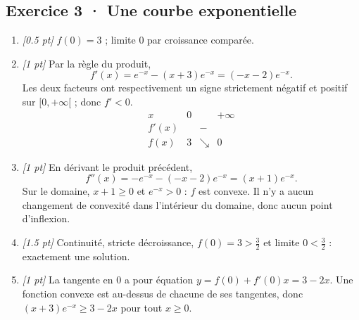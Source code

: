 \subsection*{Exercice 3 · Une courbe exponentielle}\begin{enumerate}

\item \textit{[\num{0,5} pt]} $f(0)=3$ ; limite $0$ par croissance comparée.

\item \textit{[1 pt]} Par la règle du produit,
\[f'(x)=e^{-x}-(x+3)e^{-x}=(-x-2)e^{-x}.\]
Les deux facteurs ont respectivement un signe strictement négatif et positif sur $[0,+\infty[$ ; donc $f'<0$.
\[\begin{array}{c|ccc}x&0&&+\infty\\\hline f'(x)&&-&\\\hline f(x)&3&\searrow&0\end{array}\]

\item \textit{[1 pt]} En dérivant le produit précédent,
\[f''(x)=-e^{-x}-(-x-2)e^{-x}=(x+1)e^{-x}.\]
Sur le domaine, $x+1\ge0$ et $e^{-x}>0$ : $f$ est convexe. Il n'y a aucun changement de convexité dans l'intérieur du domaine, donc aucun point d'inflexion.

\item \textit{[\num{1,5} pt]} Continuité, stricte décroissance, $f(0)=3>\frac{3}{2}$ et limite $0<\frac{3}{2}$ : exactement une solution.

\item \textit{[1 pt]} La tangente en $0$ a pour équation $y=f(0)+f'(0)x=3-2x$. Une fonction convexe est au-dessus de chacune de ses tangentes, donc $(x+3)e^{-x}\ge 3-2x$ pour tout $x\ge0$.

\end{enumerate}

